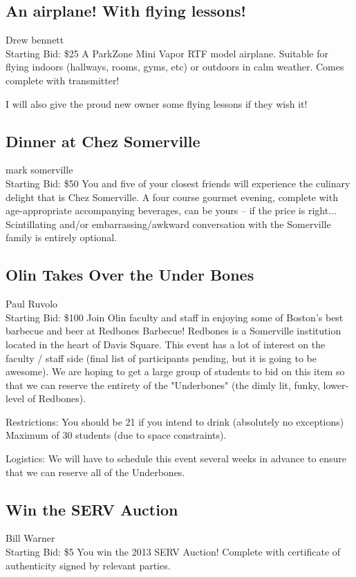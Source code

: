 \documentclass[11pt]{article}
\begin{document}
\subsection{An airplane!  With flying lessons!}
Drew bennett
\\
Starting Bid: \$25
\newline
A ParkZone Mini Vapor RTF model airplane. Suitable for flying indoors (hallways, rooms, gyms, etc) or outdoors in calm weather.  Comes complete with transmitter!

I will also give the proud new owner some flying lessons if they wish it!
\subsection{Dinner at Chez Somerville}
mark somerville
\\
Starting Bid: \$50
\newline
You and five of your closest friends will experience the culinary delight that is Chez Somerville.  A four course gourmet evening, complete with age-appropriate accompanying beverages, can be yours -- if the price is right... Scintillating and/or embarrassing/awkward conversation with the Somerville family is entirely optional.
\subsection{Olin Takes Over the Under Bones}
Paul Ruvolo
\\
Starting Bid: \$100
\newline
Join Olin faculty and staff in enjoying some of Boston's best barbecue and beer at Redbones Barbecue!  Redbones is a Somerville institution located in the heart of Davis Square.  This event has a lot of interest on the faculty / staff side (final list of participants pending, but it is going to be awesome).  We are hoping to get a large group of students to bid on this item so that we can reserve the entirety of the "Underbones" (the dimly lit, funky, lower-level of Redbones).

Restrictions:
You should be 21 if you intend to drink (absolutely no exceptions)
Maximum of 30 students (due to space constraints).

Logistics:
We will have to schedule this event several weeks in advance to ensure that we can reserve all of the Underbones.
\subsection{Win the SERV Auction}
Bill Warner
\\
Starting Bid: \$5
\newline
You win the 2013 SERV Auction! Complete with certificate of authenticity signed by relevant parties.
\end{document}
